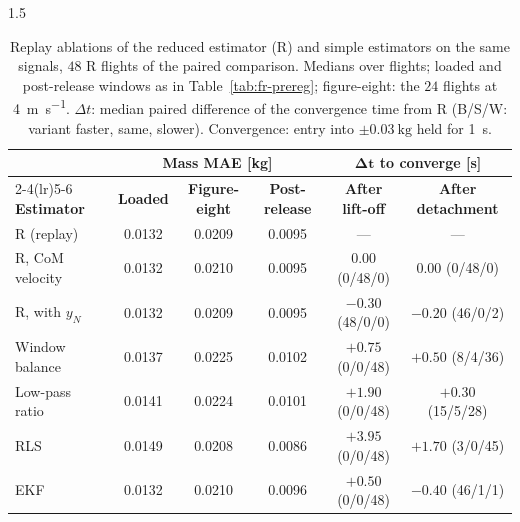 \begin{spacing}{1.5}
\begin{table}[ht]
\centering
\caption[Replay ablations of the reduced estimator and simple baselines]{Replay
ablations of the reduced estimator (R) and simple estimators on the same
signals, $48$ R flights of the paired comparison. Medians over flights; loaded
and post-release windows as in Table~\ref{tab:fr-prereg}; figure-eight: the
$24$ flights at \SI{4}{\meter\per\second}. $\Delta t$: median paired difference
of the convergence time from R (B/S/W: variant faster, same, slower).
Convergence: entry into $\pm\SI{0.03}{\kg}$ held for \SI{1}{\second}.}
\label{tab:replayablation}
\footnotesize
\setlength{\tabcolsep}{3pt}
\begin{tabular}{@{}l c c c c c@{}}
\toprule
& \multicolumn{3}{c}{\textbf{Mass MAE [kg]}} & \multicolumn{2}{c}{$\bm{\Delta t}$ \textbf{to converge [s]}} \\
\cmidrule(lr){2-4}\cmidrule(lr){5-6}
\textbf{Estimator} & \textbf{Loaded} & \textbf{Figure-eight} & \textbf{Post-release} & \textbf{After lift-off} & \textbf{After detachment} \\
\midrule
R (replay)        & 0.0132 & 0.0209 & 0.0095 & ---              & ---              \\
R, CoM velocity   & 0.0132 & 0.0210 & 0.0095 & $0.00$ (0/48/0)  & $0.00$ (0/48/0)  \\
R, with $y_N$     & 0.0132 & 0.0209 & 0.0095 & $-0.30$ (48/0/0) & $-0.20$ (46/0/2) \\
\midrule
Window balance    & 0.0137 & 0.0225 & 0.0102 & $+0.75$ (0/0/48) & $+0.50$ (8/4/36) \\
Low-pass ratio    & 0.0141 & 0.0224 & 0.0101 & $+1.90$ (0/0/48) & $+0.30$ (15/5/28) \\
RLS               & 0.0149 & 0.0208 & 0.0086 & $+3.95$ (0/0/48) & $+1.70$ (3/0/45) \\
EKF               & 0.0132 & 0.0210 & 0.0096 & $+0.50$ (0/0/48) & $-0.40$ (46/1/1) \\
\bottomrule
\end{tabular}
\end{table}


\end{spacing}

